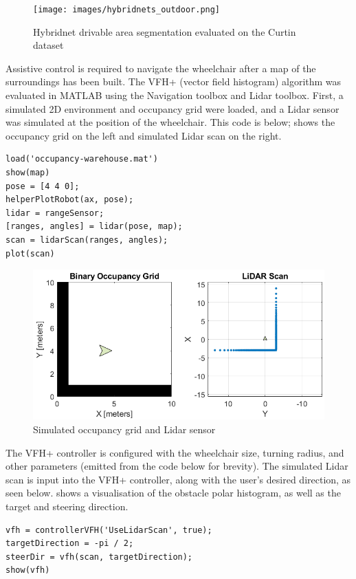 \begin{figure}[H]
    \centering
    \texttt{[image: images/hybridnets\_outdoor.png]}
    \caption{Hybridnet drivable area segmentation evaluated on the Curtin dataset}
    \label{fig:hybridnets_outdoor}
\end{figure}

Assistive control is required to navigate the wheelchair after a map of the surroundings has been built.
The VFH+ (vector field histogram) \cite{ulrichVFHReliableObstacle1998} algorithm was evaluated
in MATLAB using the Navigation toolbox and Lidar toolbox.
First, a simulated 2D environment and occupancy grid were loaded,
and a Lidar sensor was simulated at the position of the wheelchair. This code is below;
 shows the occupancy grid on the left and simulated
Lidar scan on the right.

\begin{verbatim}
load('occupancy-warehouse.mat')
show(map)
pose = [4 4 0];
helperPlotRobot(ax, pose);
lidar = rangeSensor;
[ranges, angles] = lidar(pose, map);
scan = lidarScan(ranges, angles);
plot(scan)
\end{verbatim}

\begin{figure}[H]
    \centering
    \includegraphics[width=0.5\linewidth]{images/simulated_lidar.png}
    \caption{Simulated occupancy grid and Lidar sensor}
    \label{fig:simulated_lidar}
\end{figure}

The VFH+ controller is configured with the wheelchair size,
turning radius, and other parameters (emitted from the code below for brevity).
The simulated Lidar scan is input into the VFH+ controller, along with
the user's desired direction, as seen below.  shows a visualisation
of the obstacle polar histogram, as well as the target and steering direction.

\begin{verbatim}
vfh = controllerVFH('UseLidarScan', true);
targetDirection = -pi / 2;
steerDir = vfh(scan, targetDirection);
show(vfh)
\end{verbatim}

